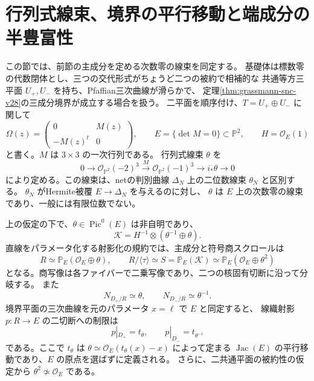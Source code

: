 \section{行列式線束、境界の平行移動と端成分の半豊富性}
\label{sec:ruled-line-bundle-v29}

この節では、前節の主成分を定める次数零の線束を同定する。
基礎体は標数零の代数閉体とし、三つの交代形式がちょうど二つの被約で相補的な
共通等方三平面 $U_+,U_-$ を持ち、Pfaffian三次曲線が滑らかで、
定理\ref{thm:grassmann-snc-v28}の三成分境界が成立する場合を扱う。
二平面を順序付け、$T=U_+\oplus U_-$ に関して
\[
 \Omega(z)=\begin{pmatrix}0&M(z)\\-M(z)^t&0\end{pmatrix},
 \qquad E=\{\det M=0\}\subset\mathbb P^2,
 \qquad H=\mathcal O_E(1)
\]
と書く。$M$ は $3\times3$ の一次行列である。
行列式線束 $\theta$ を
\begin{equation}\label{eq:determinantal-theta-v29}
 0\longrightarrow\mathcal O_{\mathbb P^2}(-2)^3
 \xrightarrow{M}\mathcal O_{\mathbb P^2}(-1)^3
 \longrightarrow i_*\theta\longrightarrow0
\end{equation}
により定める。この線束は、netの判別曲線 $\Delta_N$ 上の二位数線束 $\theta_N$ と区別する。
$\theta_N$ がHermite被覆 $E\to\Delta_N$ を与えるのに対し、
$\theta$ は $E$ 上の次数零の線束であり、一般には有限位数でない。

\begin{theorem}[主成分と符号商を定める線束]
\label{thm:ruled-determinantal-line-v29}
上の仮定の下で、$\theta\in\operatorname{Pic}^0(E)$ は非自明であり、
\begin{equation}\label{eq:kernel-theta-v29}
 \mathcal K=H^{-1}\otimes(\theta^{-1}\oplus\theta).
\end{equation}
直線をパラメータ化する射影化の規約では、主成分と符号商スクロールは
\begin{equation}\label{eq:ruled-square-v29}
 R\simeq\mathbb P_E(\mathcal O_E\oplus\theta),\qquad
 R/\langle\tau\rangle\simeq
 S=\mathbb P_E(\mathcal K)\simeq
 \mathbb P_E(\mathcal O_E\oplus\theta^2)
\end{equation}
となる。商写像は各ファイバーで二乗写像であり、二つの核固有切断に沿って分岐する。
また
\begin{equation}\label{eq:normal-theta-v29}
 N_{D_+/R}\simeq\theta,\qquad N_{D_-/R}\simeq\theta^{-1}.
\end{equation}
境界平面の三次曲線を元のパラメータ $x=\ell$ で $E$ と同定すると、
線織射影 $p:R\to E$ の二切断への制限は
\begin{equation}\label{eq:boundary-translation-v29}
 p|_{D_+}=t_\theta,\qquad p|_{D_-}=t_{\theta^{-1}}
\end{equation}
である。ここで $t_\theta$ は
$\theta\simeq\mathcal O_E(t_\theta(x)-x)$ によって定まる
$\operatorname{Jac}(E)$ の平行移動であり、$E$ の原点を選ばずに定義される。
さらに、二共通平面の被約性の仮定から $\theta^2\not\simeq\mathcal O_E$ である。
\end{theorem}

